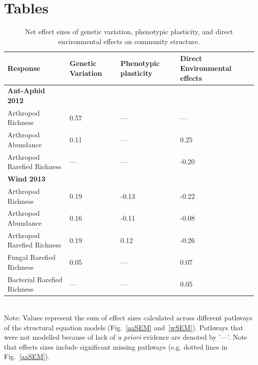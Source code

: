 \documentclass[11pt]{article}
\begin{document}

\newpage{}

\section*{Tables}
\renewcommand{\thetable}{\arabic{table}}
\setcounter{table}{0}


\begin{table}
\caption{Net effect sizes of genetic variation, phenotypic plasticity, and direct environmental effects on community structure.}
\label{tab:SEM}
\centering
\begin{tabular}{@{}llll@{}}
\toprule
Response & Genetic Variation & Phenotypic plasticity & Direct Environmental effects \\ 
\midrule
\textbf{Ant-Aphid 2012} & & & \\
Arthropod Richness  & 0.57 & --- & --- \\
Arthropod Abundance & 0.11 & --- & 0.25 \\
Arthropod Rarefied Richness & ---  & --- & -0.20 \\
\textbf{Wind 2013} & & & \\
 Arthropod Richness & 0.19 & -0.13 & -0.22 \\
Arthropod Abundance & 0.16 & -0.11 & -0.08 \\
Arthropod Rarefied Richness & 0.19 & 0.12 & -0.26 \\
Fungal Rarefied Richness & 0.05 & --- & 0.07 \\
Bacterial Rarefied Richness & --- & --- & 0.05 \\
\bottomrule
\end{tabular}
\bigskip{}
\\
{\footnotesize Note: Values represent the sum of effect sizes calculated across different pathways of the structural equation models (Fig.~\ref{aaSEM} and~\ref{wSEM}). Pathways that were not modelled because of lack of \textit{a priori} evidence are denoted by '---'. Note that effects sizes include significant missing pathways (e.g. dotted lines in Fig.~\ref{aaSEM}).}
\end{table}
\end{document}
